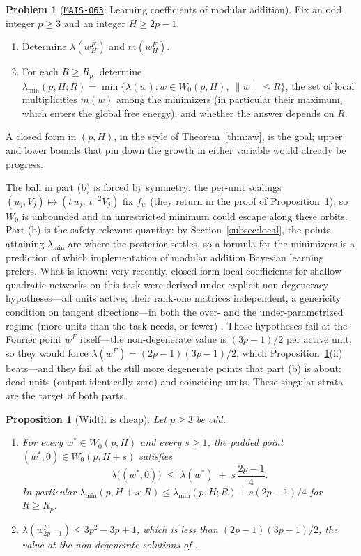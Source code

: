 \documentclass[11pt]{amsart}
\newcommand{\Oid}[1]{\href{https://github.com/lionellevine/MAIS/blob/main/open-problems/MAIS-O#1.md}{\texttt{MAIS-O#1}}}
\theoremstyle{plain}
\newtheorem{proposition}[theorem]{Proposition}
\theoremstyle{definition}
\newtheorem{problem}[theorem]{Problem}
\begin{document}
\begin{problem}[\Oid{63}: Learning coefficients of modular addition]\label{prob:modadd}
Fix an odd integer $p \ge 3$ and an integer $H \ge 2p - 1$.
\begin{enumerate}
\item[(a)] Determine $\lambda(w^F_H)$ and $m(w^F_H)$.
\item[(b)] For each $R \ge R_p$, determine
$\lambda_{\min}(p, H; R) = \min \{\lambda(w) : w \in W_0(p,H),\ \|w\| \le R\}$,
the set of local multiplicities $m(w)$ among the minimizers (in particular their maximum, which enters the global free energy), and whether the answer depends on $R$.
\end{enumerate}
A closed form in $(p, H)$, in the style of Theorem~\ref{thm:aw}, is the goal; upper and lower bounds that pin down the growth in either variable would already be progress.
\end{problem}

The ball in part (b) is forced by symmetry: the per-unit scalings $(u_j, V_j) \mapsto (t\,u_j,\ t^{-2}V_j)$ fix $f_w$ (they return in the proof of Proposition~\ref{prop:width}), so $W_0$ is unbounded and an unrestricted minimum could escape along these orbits. Part (b) is the safety-relevant quantity: by Section~\ref{subsec:local}, the points attaining $\lambda_{\min}$ are where the posterior settles, so a formula for the minimizers is a prediction of which implementation of modular addition Bayesian learning prefers. What is known: very recently, closed-form local coefficients for shallow quadratic networks on this task were derived under explicit non-degeneracy hypotheses---all units active, their rank-one matrices independent, a genericity condition on tangent directions---in both the over- and the under-parametrized regime (more units than the task needs, or fewer) \cite{cullen2026}. Those hypotheses fail at the Fourier point $w^F$ itself---the non-degenerate value is $(3p-1)/2$ per active unit, so they would force $\lambda(w^F) = (2p-1)(3p-1)/2$, which Proposition~\ref{prop:width}(ii) beats---and they fail at the still more degenerate points that part (b) is about: dead units (output identically zero) and coinciding units. These singular strata are the target of both parts.

\begin{proposition}[Width is cheap]\label{prop:width}
Let $p \ge 3$ be odd.
\begin{enumerate}
\item[(i)] For every $w^* \in W_0(p, H)$ and every $s \ge 1$, the padded point $(w^*, 0) \in W_0(p, H+s)$ satisfies
\[
   \lambda\bigl((w^*, 0)\bigr) \;\le\; \lambda(w^*) \;+\; s\,\frac{2p-1}{4}.
\]
In particular $\lambda_{\min}(p, H+s; R) \le \lambda_{\min}(p, H; R) + s(2p-1)/4$ for $R \ge R_p$.
\item[(ii)] $\lambda(w^F_{2p-1}) \le 3p^2 - 3p + 1$, which is less than $(2p-1)(3p-1)/2$, the value at the non-degenerate solutions of \cite{cullen2026}.
\end{enumerate}
\end{proposition}
\end{document}
